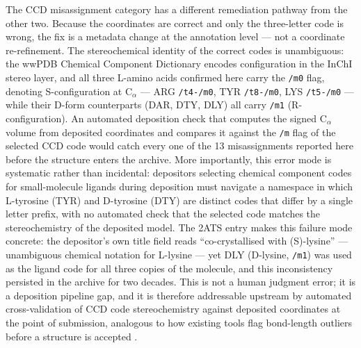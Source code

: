 \documentclass[11pt]{article}
\begin{document}
The CCD misassignment category has a different remediation pathway from the other two. Because the coordinates are correct and only the three-letter code is wrong, the fix is a metadata change at the annotation level --- not a coordinate re-refinement. The stereochemical identity of the correct codes is unambiguous: the wwPDB Chemical Component Dictionary encodes configuration in the InChI stereo layer, and all three L-amino acids confirmed here carry the \texttt{/m0} flag, denoting S-configuration at C$_\alpha$ --- ARG \texttt{/t4-/m0}, TYR \texttt{/t8-/m0}, LYS \texttt{/t5-/m0} --- while their D-form counterparts (DAR, DTY, DLY) all carry \texttt{/m1} (R-configuration). An automated deposition check that computes the signed C$_\alpha$ volume from deposited coordinates and compares it against the \texttt{/m} flag of the selected CCD code would catch every one of the 13 misassignments reported here before the structure enters the archive. More importantly, this error mode is systematic rather than incidental: depositors selecting chemical component codes for small-molecule ligands during deposition must navigate a namespace in which L-tyrosine (TYR) and D-tyrosine (DTY) are distinct codes that differ by a single letter prefix, with no automated check that the selected code matches the stereochemistry of the deposited model. The 2ATS entry makes this failure mode concrete: the depositor's own title field reads ``co-crystallised with (S)-lysine'' --- unambiguous chemical notation for L-lysine --- yet DLY (D-lysine, \texttt{/m1}) was used as the ligand code for all three copies of the molecule, and this inconsistency persisted in the archive for two decades. This is not a human judgment error; it is a deposition pipeline gap, and it is therefore addressable upstream by automated cross-validation of CCD code stereochemistry against deposited coordinates at the point of submission, analogous to how existing tools flag bond-length outliers before a structure is accepted \citep{shao2015,outcome2016}.
\end{document}
